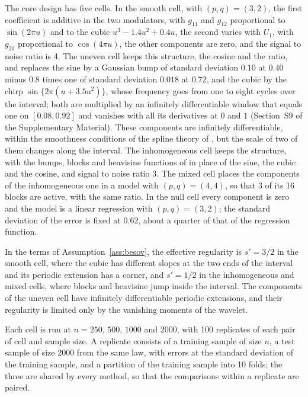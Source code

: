 \documentclass[12pt]{article} %
\theoremstyle{definition}
\theoremstyle{plain}
\newcommand{\gcomp}[2]{g_{#1#2}}
\newcommand{\seff}{s'}
\begin{document}
{The core design has five cells. In the smooth cell, with $(p,q) = (3,2)$, the
first coefficient is additive in the two modulators, with $\gcomp{1}{1}$ and
$\gcomp{1}{2}$ proportional to $\sin(2\pi u)$ and to the cubic
$u^{3} - 1.4u^{2} + 0.4u$, the second varies with $U_1$, with $\gcomp{2}{1}$
proportional to $\cos(4\pi u)$, the other components are zero, and the signal
to noise ratio is 4. The uneven cell keeps this structure, the cosine and the
ratio, and replaces the sine by a Gaussian bump of standard deviation $0.10$
at $0.40$ minus $0.8$ times one of standard deviation $0.018$ at $0.72$, and
the cubic by the chirp $\sin\{2\pi(u + 3.5u^{2})\}$, whose frequency goes from
one to eight cycles over the interval; both are multiplied by an infinitely
differentiable window that equals one on $[0.08, 0.92]$ and vanishes with all
its derivatives at $0$ and $1$ (Section~S9 of the Supplementary Material).
These components are infinitely differentiable, within the smoothness
conditions of the spline theory of \citet{Xue-Yang-2006}, but the scale of two
of them changes along the interval. The inhomogeneous cell keeps the
structure, with the bumps, blocks and heavisine functions of
\citet{Donoho-Johnstone-1994} in place of the sine, the cubic and the cosine,
and signal to noise ratio 3. The mixed cell places the components of the
inhomogeneous one in a model with $(p,q) = (4,4)$, so that 3 of its 16 blocks
are active, with the same ratio. In the null cell every component is zero and
the model is a linear regression with $(p,q) = (3,2)$; the standard deviation
of the error is fixed at $0.62$, about a quarter of that of the regression
function.

In the terms of Assumption~\ref{ass:besov}, the effective regularity is
$\seff = 3/2$ in the smooth cell, where the cubic has different slopes at the
two ends of the interval and its periodic extension has a corner, and
$\seff = 1/2$ in the inhomogeneous and mixed cells, where blocks and heavisine
jump inside the interval. The components of the uneven cell have infinitely
differentiable periodic extensions, and their regularity is limited only by
the vanishing moments of the wavelet.

Each cell is run at $n = 250$, $500$, $1000$ and $2000$, with 100 replicates
of each pair of cell and sample size. A replicate consists of a training
sample of size $n$, a test sample of size 2000 from the same law, with errors
at the standard deviation of the training sample, and a partition of the
training sample into 10 folds; the three are shared by every method, so that
the comparisons within a replicate are paired.

}
\end{document}

